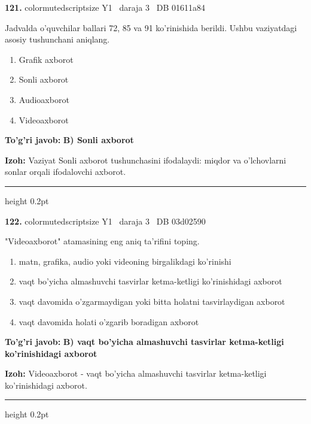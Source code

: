 \documentclass[10pt,a4paper,oneside]{article}
\begin{document}
\noindent\textbf{\color{ink}121.}  {color{muted}scriptsize Y1 \textbullet\ daraja 3 \textbullet\ DB 01611a84}
\par
Jadvalda o'quvchilar ballari 72, 85 va 91 ko'rinishida berildi. Ushbu vaziyatdagi asosiy tushunchani aniqlang.
\begin{enumerate}[label=\Alph*),leftmargin=9mm]
\item Grafik axborot
\item Sonli axborot
\item Audioaxborot
\item Videoaxborot
\end{enumerate}
\begin{tcolorbox}[enhanced,breakable,colback=teal!4,colframe=teal!50!black,boxrule=0.5pt,arc=1.1mm,left=3mm,right=3mm,top=1.7mm,bottom=1.7mm,before skip=2mm,after skip=2mm]
\textbf{\color{teal}To'g'ri javob:} \textbf{B) Sonli axborot}
\par\smallskip
\textbf{Izoh:} Vaziyat Sonli axborot tushunchasini ifodalaydi: miqdor va o'lchovlarni sonlar orqali ifodalovchi axborot.
\end{tcolorbox}
\vspace{2mm}\hrule height 0.2pt \vspace{3mm}

\noindent\textbf{\color{ink}122.}  {color{muted}scriptsize Y1 \textbullet\ daraja 3 \textbullet\ DB 03d02590}
\par
"Videoaxborot" atamasining eng aniq ta'rifini toping.
\begin{enumerate}[label=\Alph*),leftmargin=9mm]
\item matn, grafika, audio yoki videoning birgalikdagi ko'rinishi
\item vaqt bo'yicha almashuvchi tasvirlar ketma-ketligi ko'rinishidagi axborot
\item vaqt davomida o'zgarmaydigan yoki bitta holatni tasvirlaydigan axborot
\item vaqt davomida holati o'zgarib boradigan axborot
\end{enumerate}
\begin{tcolorbox}[enhanced,breakable,colback=teal!4,colframe=teal!50!black,boxrule=0.5pt,arc=1.1mm,left=3mm,right=3mm,top=1.7mm,bottom=1.7mm,before skip=2mm,after skip=2mm]
\textbf{\color{teal}To'g'ri javob:} \textbf{B) vaqt bo'yicha almashuvchi tasvirlar ketma-ketligi ko'rinishidagi axborot}
\par\smallskip
\textbf{Izoh:} Videoaxborot - vaqt bo'yicha almashuvchi tasvirlar ketma-ketligi ko'rinishidagi axborot.
\end{tcolorbox}
\vspace{2mm}\hrule height 0.2pt \vspace{3mm}
\end{document}
